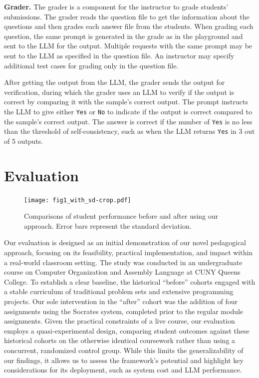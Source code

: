 \documentclass{article} %
\begin{document}
\textbf{Grader.} The grader is a component for the instructor to grade students'
submissions. The grader reads the question file to get the information about the
questions and then grades each answer file from the students. When grading each
question, the same prompt is generated in the grade as in the playground and
sent to the LLM for the output. Multiple requests with the same prompt may be
sent to the LLM as specified in the question file. An instructor may specify
additional test cases for grading only in the question file.

After getting the output from the LLM, the grader sends the output for
verification, during which the grader uses an LLM to verify if the output is
correct by comparing it with the sample's correct output. The prompt instructs the
LLM to give either \texttt{Yes} or \texttt{No} to indicate if the output is correct compared to
the sample's correct output. The answer is correct if the number of \texttt{Yes} is no less
than the threshold of self-consistency, such as when the LLM returns \texttt{Yes} in 3 out of 5 outputs.

\section{Evaluation}
\label{sec:evaluation}
\begin{figure}
\centering
\texttt{[image: fig1\_with\_sd-crop.pdf]}
\caption{Comparisons of student performance before and after using our approach. Error bars represent the standard deviation.}
\label{fig1}
\end{figure}
Our evaluation is designed as an initial demonstration of our novel pedagogical approach, focusing on its feasibility, practical implementation, and impact within a real-world classroom setting. The study was conducted in an undergraduate course on Computer Organization and Assembly Language at CUNY Queens College. To establish a clear baseline, the historical ``before'' cohorts engaged with a stable curriculum of traditional problem sets and extensive programming projects. Our sole intervention in the ``after'' cohort was the addition of four assignments using the \textsf{Socrates} system, completed prior to the regular module assignments. Given the practical constraints of a live course, our evaluation employs a quasi-experimental design, comparing student outcomes against these historical cohorts on the otherwise identical coursework rather than using a concurrent, randomized control group. While this limits the generalizability of our findings, it allows us to assess the framework’s potential and highlight key considerations for its deployment, such as system cost and LLM performance.
\end{document}
